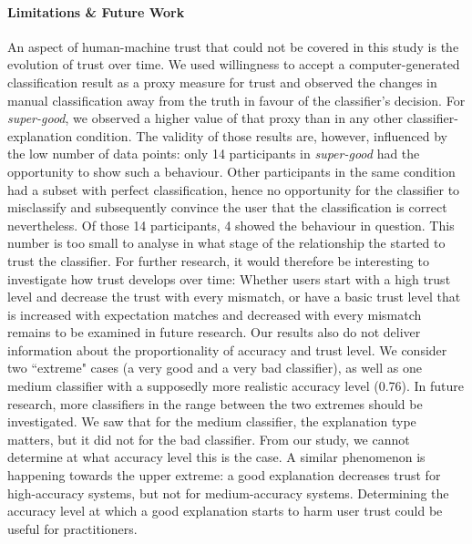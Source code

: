 \paragraph{Limitations \& Future Work}
An aspect of human-machine trust that could not be covered in this study is the evolution of trust over time. We used willingness to accept a computer-generated classification result as a proxy measure for trust and observed the changes in manual classification away from the truth in favour of the classifier's decision. For \textit{super-good}, we observed a higher value of that proxy than in any other classifier-explanation condition. The validity of those results are, however, influenced by the low number of data points: only 14 participants in \textit{super-good} had the opportunity to show such a behaviour. Other participants in the same condition had a subset with perfect classification, hence no opportunity for the classifier to misclassify and subsequently convince the user that the classification is correct nevertheless. Of those 14 participants, 4 showed the behaviour in question. This number is too small to analyse in what stage of the relationship the started to trust the classifier. For further research, it would therefore be interesting to investigate how trust develops over time: Whether users start with a high trust level and decrease the trust with every mismatch, or have a basic trust level that is increased with expectation matches and decreased with every mismatch remains to be examined in future research.\newline
Our results also do not deliver information about the proportionality of accuracy and trust level. We consider two ``extreme" cases (a very good and a very bad classifier), as well as one medium classifier with a supposedly more realistic accuracy level (0.76). In future research, more classifiers in the range between the two extremes should be investigated. We saw that for the medium classifier, the explanation type matters, but it did not for the bad classifier. From our study, we cannot determine at what accuracy level this is the case. A similar phenomenon is happening towards the upper extreme: a good explanation decreases trust for high-accuracy systems, but not for medium-accuracy systems. Determining the accuracy level at which a good explanation starts to harm user trust could be useful for practitioners.\newline
